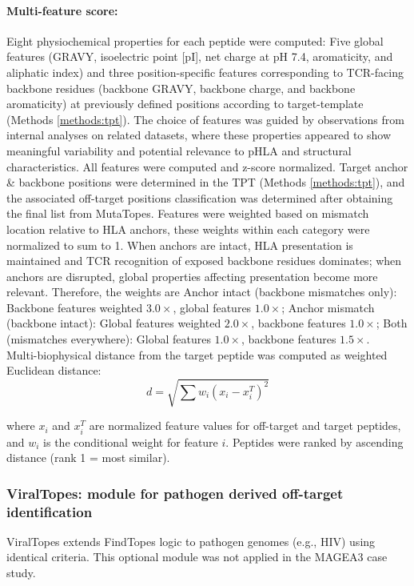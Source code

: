 \documentclass[times, twoside, watermark]{zHenriquesLab-StyleBioRxiv}
\begin{document}
        \paragraph{Multi-feature score:}\label{methods:multi_feature} 
            Eight physiochemical properties for each peptide were computed: Five global features (GRAVY, isoelectric point [pI], net charge at pH 7.4, aromaticity, and aliphatic index) and three position-specific features corresponding to TCR-facing backbone residues (backbone GRAVY, backbone charge, and backbone aromaticity) at previously defined positions according to target-template (Methods \ref{methods:tpt}). 
            The choice of features was guided by observations from internal analyses on related datasets, where these properties appeared to show meaningful variability and potential relevance to pHLA and structural characteristics. 
            All features were computed and z-score normalized. Target anchor \& backbone positions were determined in the TPT (Methods \ref{methods:tpt}), and the associated off-target positions classification was determined after obtaining the final list from MutaTopes. Features were weighted based on mismatch location relative to HLA anchors, these weights within each category were normalized to sum to 1. 
            When anchors are intact, HLA presentation is maintained and TCR recognition of exposed backbone residues dominates; when anchors are disrupted, global properties affecting presentation become more relevant. Therefore, the weights are Anchor intact (backbone mismatches only): Backbone features weighted $3.0\times$, global features $1.0\times$; Anchor mismatch (backbone intact): Global features weighted $2.0\times$, backbone features $1.0\times$; Both (mismatches everywhere): Global features $1.0\times$, backbone features $1.5\times$.\\ 
            Multi-biophysical distance from the target peptide was computed as weighted Euclidean distance:
            \begin{equation}
                d = \sqrt{\sum w_i (x_i - x^T_i)^2}
            \end{equation}
        
        where $x_i$ and $x^T_i$ are normalized feature values for off-target and target peptides, and $w_i$ is the conditional weight for feature $i$. Peptides were ranked by ascending distance (rank 1 = most similar).
        
        \subsubsection{ViralTopes: module for pathogen derived off-target identification}\label{methods:viraltopes} 
            ViralTopes extends FindTopes logic to pathogen genomes (e.g., HIV) using identical criteria. This optional module was not applied in the MAGEA3 case study.
    
\end{document}
